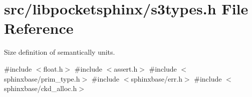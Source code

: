 \section{src/libpocketsphinx/s3types.h File Reference}
\label{s3types_8h}


Size definition of semantically units.  


{\ttfamily \#include $<$float.\+h$>$}\newline
{\ttfamily \#include $<$assert.\+h$>$}\newline
{\ttfamily \#include $<$sphinxbase/prim\+\_\+type.\+h$>$}\newline
{\ttfamily \#include $<$sphinxbase/err.\+h$>$}\newline
{\ttfamily \#include $<$sphinxbase/ckd\+\_\+alloc.\+h$>$}\newline
